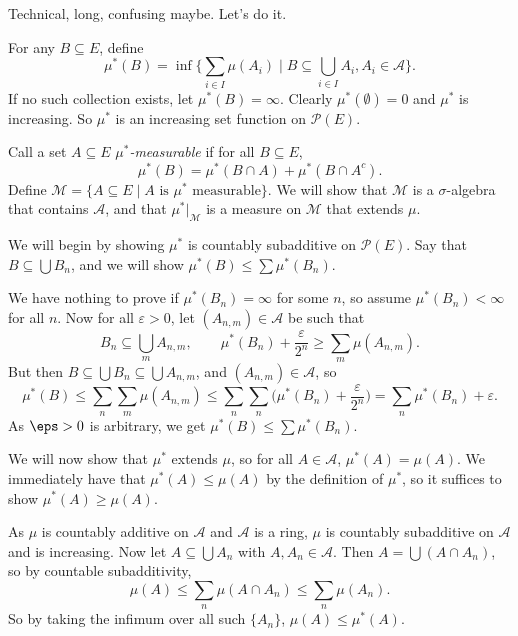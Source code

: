 \documentclass[12pt]{article}
\begin{document}
\begin{proofbox}
	Technical, long, confusing maybe. Let's do it.

	For any $B \subseteq E$, define
	\[
		\mu^{\ast}(B) = \inf \Biggl\{ \sum_{i \in I} \mu (A_i) \mid B \subseteq \bigcup_{i \in I} A_i, A_i \in \mathcal{A} \Biggr\}.
	\]
	If no such collection exists, let $\mu^{\ast}(B) = \infty$. Clearly $\mu^{\ast}(\emptyset) = 0$ and $\mu^{\ast}$ is increasing. So $\mu^{\ast}$ is an increasing set function on $\mathcal{P}(E)$.

	Call a set $A \subseteq E$ $\mu^{\ast}$\emph{-measurable} if for all $B \subseteq E$,
	\[
	\mu^{\ast}(B) = \mu^{\ast}(B \cap A) + \mu^{\ast}(B \cap A^{c}).
	\]
	Define $\mathcal{M} = \{A \subseteq E \mid A \text{ is $\mu^{\ast}$ measurable}\}$. We will show that $\mathcal{M}$ is a $\sigma$-algebra that contains $\mathcal{A}$, and that $\mu^{\ast}|_\mathcal{M}$ is a measure on $\mathcal{M}$ that extends $\mu$.

	We will begin by showing $\mu^{\ast}$ is countably subadditive on $\mathcal{P}(E)$. Say that $B \subseteq \bigcup B_n$, and we will show $\mu^{\ast}(B) \leq \sum \mu^{\ast} (B_n)$.

	We have nothing to prove if $\mu^{\ast}(B_n) = \infty$ for some $n$, so assume $\mu^{\ast}(B_n) < \infty$ for all $n$. Now for all $\varepsilon > 0$, let $(A_{n, m}) \in \mathcal{A}$ be such that
	\[
	B_n \subseteq \bigcup_m A_{n, m}, \qquad \mu^{\ast}(B_n) + \frac{\varepsilon}{2^{n}} \geq  \sum_m \mu (A_{n, m}).
	\]
	But then $B \subseteq \bigcup B_n \subseteq \bigcup A_{n, m}$, and $(A_{n, m}) \in \mathcal{A}$, so
	\[
	\mu^{\ast}(B) \leq \sum_n \sum_m \mu(A_{n, m}) \leq \sum_n \sum_n \biggl( \mu^{\ast}(B_n) + \frac{\varepsilon}{2^{n}}\biggr) = \sum_{n} \mu^{\ast}(B_n) + \varepsilon.
	\]
	As $\eps > 0$ is arbitrary, we get $\mu^{\ast}(B) \leq \sum \mu^{\ast}(B_n)$.

	We will now show that $\mu^{\ast}$ extends $\mu$, so for all $A \in \mathcal{A}$, $\mu^{\ast}(A) = \mu(A)$. We immediately have that $\mu^{\ast}(A) \leq \mu(A)$ by the definition of $\mu^{\ast}$, so it suffices to show $\mu^{\ast}(A) \geq \mu(A)$.

	As $\mu$ is countably additive on $\mathcal{A}$ and $\mathcal{A}$ is a ring, $\mu$ is countably subadditive on $\mathcal{A}$ and is increasing. Now let $A \subseteq \bigcup A_n$ with $A, A_n \in \mathcal{A}$. Then $A = \bigcup (A \cap A_n)$, so by countable subadditivity,
	\[
	\mu(A) \leq \sum_n \mu(A \cap A_n) \leq \sum_n \mu(A_n).
	\]
	So by taking the infimum over all such $\{A_n\}$, $\mu(A) \leq \mu^{\ast}(A)$.


\end{proofbox}
\end{document}
